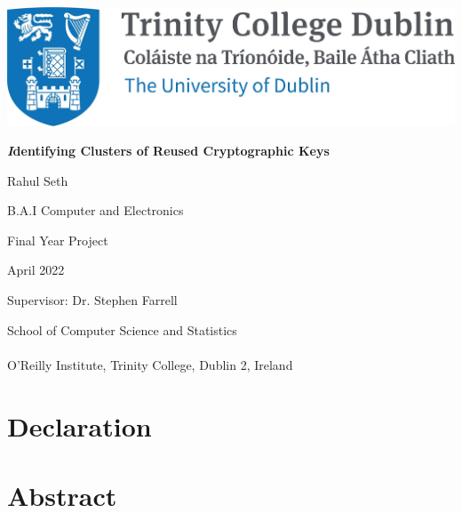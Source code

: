 \documentclass[11pt, a4paper, oneside]{report}
\begin{document}
\sloppy
\bgroup %
\linespread{0}
\thispagestyle{empty}
\begin{center}
{\sffamily

\vspace{10pt}

\includegraphics[scale=1.1]{tcd.png}

\vspace{10pt}


\vspace{80pt}

\textbf{ \Large \emph Identifying Clusters of Reused Cryptographic Keys}

\vspace{30pt}

Rahul Seth 

B.A.I Computer and Electronics 

Final Year Project 

April 2022

Supervisor: Dr. Stephen Farrell

\vspace{110pt}

\large{School of Computer Science and Statistics
\\$ $\\
O'Reilly Institute, Trinity College, Dublin 2, Ireland}
\linespread{1}
}
\end{center}
\egroup %

\chapter*{Declaration}


\chapter*{Abstract}


\end{document}

